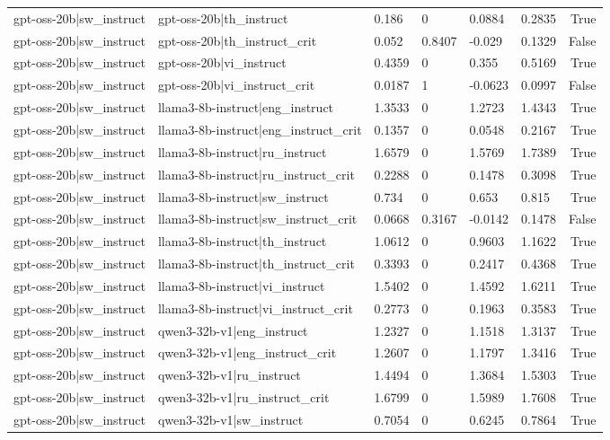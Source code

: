 \begin{table}
\begin{tabular}{llllllr}
gpt-oss-20b|sw_instruct & gpt-oss-20b|th_instruct & 0.186 & 0 & 0.0884 & 0.2835 & True \\
gpt-oss-20b|sw_instruct & gpt-oss-20b|th_instruct_crit & 0.052 & 0.8407 & -0.029 & 0.1329 & False \\
gpt-oss-20b|sw_instruct & gpt-oss-20b|vi_instruct & 0.4359 & 0 & 0.355 & 0.5169 & True \\
gpt-oss-20b|sw_instruct & gpt-oss-20b|vi_instruct_crit & 0.0187 & 1 & -0.0623 & 0.0997 & False \\
gpt-oss-20b|sw_instruct & llama3-8b-instruct|eng_instruct & 1.3533 & 0 & 1.2723 & 1.4343 & True \\
gpt-oss-20b|sw_instruct & llama3-8b-instruct|eng_instruct_crit & 0.1357 & 0 & 0.0548 & 0.2167 & True \\
gpt-oss-20b|sw_instruct & llama3-8b-instruct|ru_instruct & 1.6579 & 0 & 1.5769 & 1.7389 & True \\
gpt-oss-20b|sw_instruct & llama3-8b-instruct|ru_instruct_crit & 0.2288 & 0 & 0.1478 & 0.3098 & True \\
gpt-oss-20b|sw_instruct & llama3-8b-instruct|sw_instruct & 0.734 & 0 & 0.653 & 0.815 & True \\
gpt-oss-20b|sw_instruct & llama3-8b-instruct|sw_instruct_crit & 0.0668 & 0.3167 & -0.0142 & 0.1478 & False \\
gpt-oss-20b|sw_instruct & llama3-8b-instruct|th_instruct & 1.0612 & 0 & 0.9603 & 1.1622 & True \\
gpt-oss-20b|sw_instruct & llama3-8b-instruct|th_instruct_crit & 0.3393 & 0 & 0.2417 & 0.4368 & True \\
gpt-oss-20b|sw_instruct & llama3-8b-instruct|vi_instruct & 1.5402 & 0 & 1.4592 & 1.6211 & True \\
gpt-oss-20b|sw_instruct & llama3-8b-instruct|vi_instruct_crit & 0.2773 & 0 & 0.1963 & 0.3583 & True \\
gpt-oss-20b|sw_instruct & qwen3-32b-v1|eng_instruct & 1.2327 & 0 & 1.1518 & 1.3137 & True \\
gpt-oss-20b|sw_instruct & qwen3-32b-v1|eng_instruct_crit & 1.2607 & 0 & 1.1797 & 1.3416 & True \\
gpt-oss-20b|sw_instruct & qwen3-32b-v1|ru_instruct & 1.4494 & 0 & 1.3684 & 1.5303 & True \\
gpt-oss-20b|sw_instruct & qwen3-32b-v1|ru_instruct_crit & 1.6799 & 0 & 1.5989 & 1.7608 & True \\
gpt-oss-20b|sw_instruct & qwen3-32b-v1|sw_instruct & 0.7054 & 0 & 0.6245 & 0.7864 & True \\

\end{tabular}
\end{table}
